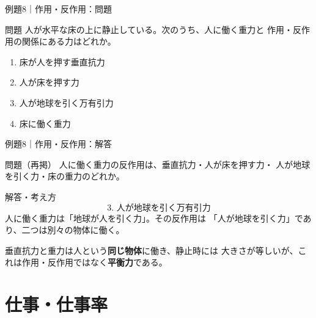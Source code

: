 \documentclass[notheorems,aspectratio=169]{beamer}
\newcommand{\jp}[1]{\textbf{\color{JapanBlue}#1}}
\newcommand{\key}[1]{\textbf{\color{ChinaRed}#1}}
\newcommand{\qcard}[1]{%
  \begin{block}{問題}\centering\large #1\end{block}}
\newcommand{\qsmall}[1]{%
  \begin{block}{問題（再掲）}\small #1\end{block}}
\newcommand{\acard}[1]{%
  \begin{exampleblock}{解答・考え方}#1\end{exampleblock}}
\begin{document}
\begin{frame}{例題8｜作用・反作用：問題}
  \vfill
  \qcard{
    人が水平な床の上に静止している。次のうち、人に働く重力と
    作用・反作用の関係にある力はどれか。
    \begin{enumerate}
      \item 床が人を押す垂直抗力
      \item 人が床を押す力
      \item 人が地球を引く万有引力
      \item 床に働く重力
    \end{enumerate}
  }
  \vfill
\end{frame}

\begin{frame}{例題8｜作用・反作用：解答}
  \qsmall{
    人に働く重力の反作用は、垂直抗力・人が床を押す力・
    人が地球を引く力・床の重力のどれか。
  }
  \acard{
    \[
      \boxed{\text{3. 人が地球を引く万有引力}}
    \]
    人に働く重力は「地球が人を引く力」。その反作用は
    「人が地球を引く力」であり、二つは別々の物体に働く。

    \vspace{0.5em}
    垂直抗力と重力は人という\key{同じ物体}に働き、静止時には
    大きさが等しいが、これは作用・反作用ではなく\jp{平衡力}である。
  }
\end{frame}

\section{仕事・仕事率}
\end{document}
